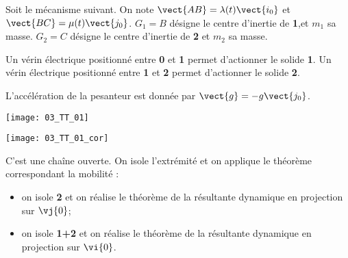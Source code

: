 \normaltrue
\correctiontrue



\setcounter{question}{0}%
\ifcorrection
\else
{}
\fi

\ifprof
\else
Soit le mécanisme suivant. On note $\vect{AB}=\lambda(t)\vect{i_0}$ et $\vect{BC}=\mu(t)\vect{j_0}$.
$G_1 = B$ désigne le centre d'inertie de \textbf{1},et $m_1$ sa masse. %
$G_2 = C$ désigne le centre d'inertie de \textbf{2} et  $m_2$ sa masse. %

 Un vérin électrique positionné entre \textbf{0} et \textbf{1} permet d'actionner le solide \textbf{1}.
 Un vérin électrique positionné entre \textbf{1} et \textbf{2} permet d'actionner le solide \textbf{2}.

L'accélération de la pesanteur est donnée par $\vect{g}=-g\vect{j_0}$.

\begin{marginfigure}
\texttt{[image: 03\_TT\_01]}
\end{marginfigure}
\fi

\ifprof
\begin{marginfigure}
\texttt{[image: 03\_TT\_01\_cor]}
\end{marginfigure}
\else
\fi

\ifprof
C'est une chaîne ouverte. On isole l'extrémité et on applique le théorème correspondant la mobilité : 
\begin{itemize}
\item on isole \textbf{2} et on réalise le théorème de la résultante dynamique en projection sur $\vj{0}$;
\item on isole \textbf{1+2} et on réalise le théorème de la résultante dynamique en projection sur $\vi{0}$.
\end{itemize}
\else
\fi


\ifprof
\else


\fi